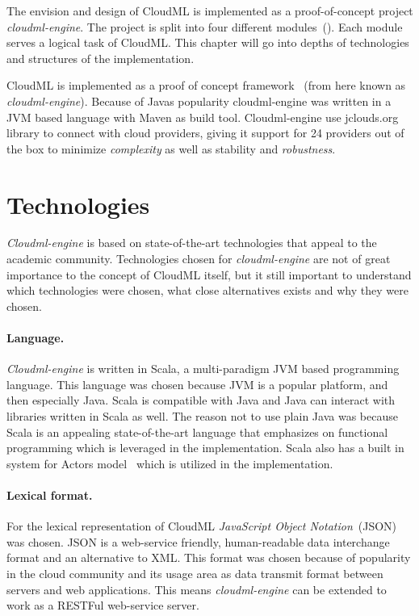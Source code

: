 





The envision and design of CloudML is implemented as a proof-of-concept project \emph{cloudml-engine}.
The project is split into four different modules~(). 
Each module serves a logical task of CloudML.
This chapter will go into depths of technologies and structures of the implementation.

CloudML is implemented as a proof of concept framework~\cite{cloudml-engine}
(from here known as \emph{cloudml-engine}). 
Because of Javas popularity cloudml-engine was written in a JVM based language with Maven as build tool.
Cloudml-engine use jclouds.org library to connect with cloud providers, giving it support
for 24 providers out of the box to minimize \emph{complexity} as well as stability and \emph{robustness}.


\section{Technologies}

\emph{Cloudml-engine} is based on state-of-the-art technologies that appeal to the academic community.
Technologies chosen for \emph{cloudml-engine} are not of great importance to the concept of CloudML itself,
but it still important to understand which technologies were chosen, what close alternatives exists
and why they were chosen.

\paragraph{Language.} 
\emph{Cloudml-engine} is written in Scala, a multi-paradigm JVM based programming language.
This language was chosen because JVM is a popular platform, and then especially Java.
Scala is compatible with Java and Java can interact with libraries written in Scala as well.
The reason not to use plain Java was because Scala is an appealing state-of-the-art language that emphasizes 
on functional programming which is leveraged in the implementation.
Scala also has a built in system for Actors model~\cite{actors:haller07} which is utilized in the implementation.

\paragraph{Lexical format.}
For the lexical representation of CloudML \emph{JavaScript Object Notation}~(JSON) was chosen.
JSON is a web-service friendly, human-readable data interchange format and an alternative to XML.
This format was chosen because of popularity in the cloud community 
and its usage area as data transmit format between servers and web applications.
This means \emph{cloudml-engine} can be extended to work as a RESTFul web-service server.

